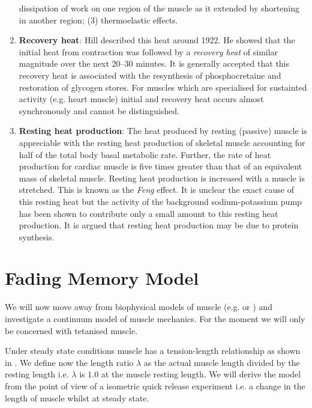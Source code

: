 \begin{enumerate}
  dissipation of work on one region of the muscle as it extended by shortening
  in another region; (3) thermoelastic effects.
\item \textbf{Recovery heat}: Hill described this heat around 1922. He showed
  that the initial heat from contraction was followed by a \emph{recovery
    heat} of similar magnitude over the next $20$--$30$ minutes. It is generally
  accepted that this recovery heat is associated with the resynthesis of
  phosphocretaine and restoration of glycogen stores. For muscles which are
  specialised for sustainted activity (e.g. heart muscle) initial and recovery
  heat occurs almost synchronously and cannot be distinguished.
\item \textbf{Resting heat production}: The heat produced by resting (passive)
  muscle is appreciable with the resting heat production of skeletal muscle
  accounting for half of the total body basal metabolic rate. Further, the
  rate of heat production for cardiac muscle is five times greater than that
  of an equivalent mass of skeletal muscle. Resting heat production is
  increased with a muscle is stretched. This is known as the \emph{Feng}
  effect. It is unclear the exact cause of this resting heat but the activity
  of the background sodium-potassium pump has been shown to contribute only a
  small amount to this resting heat production. It is argued that resting heat
  production may be due to protein synthesis.
\end{enumerate}

\section{Fading Memory Model}

We will now move away from biophysical models of muscle (e.g.
 or ) and investigate a
continuum model of muscle mechanics. For the moment we will only be concerned
with tetanised muscle.

Under steady state conditions muscle has a tension-length relationship as
shown in . We define
now the length ratio $\lambda$ as the actual muscle length divided by the
resting length i.e. $\lambda$ is $1.0$ at the muscle resting length. We will
derive the model from the point of view of a isometric quick release
experiment i.e. a change in the length of muscle whilst at steady state.

